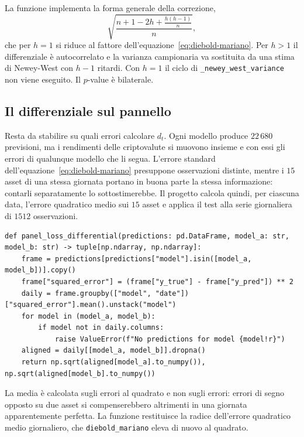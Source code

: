 La funzione implementa la forma generale della correzione,
$$\sqrt{\frac{n+1-2h+\frac{h(h-1)}{n}}{n}},$$
che per $h=1$ si riduce al fattore dell'equazione~\eqref{eq:diebold-mariano}. Per $h>1$ il differenziale è autocorrelato e la varianza campionaria va sostituita da una stima di Newey-West con $h-1$ ritardi. Con $h=1$ il ciclo di \texttt{\_newey\_west\_variance} non viene eseguito. Il $p$-value è bilaterale.

\subsection{Il differenziale sul pannello}

Resta da stabilire su quali errori calcolare $d_t$. Ogni modello produce $22\,680$ previsioni, ma i rendimenti delle criptovalute si muovono insieme e con essi gli errori di qualunque modello che li segua. L'errore standard dell'equazione~\eqref{eq:diebold-mariano} presuppone osservazioni distinte, mentre i $15$ asset di una stessa giornata portano in buona parte la stessa informazione: contarli separatamente lo sottostimerebbe. Il progetto calcola quindi, per ciascuna data, l'errore quadratico medio sui $15$ asset e applica il test alla serie giornaliera di $1512$ osservazioni.

\begin{listing}[H]
\begin{verbatim}
def panel_loss_differential(predictions: pd.DataFrame, model_a: str, model_b: str) -> tuple[np.ndarray, np.ndarray]:
    frame = predictions[predictions["model"].isin([model_a, model_b])].copy()
    frame["squared_error"] = (frame["y_true"] - frame["y_pred"]) ** 2
    daily = frame.groupby(["model", "date"])["squared_error"].mean().unstack("model")
    for model in (model_a, model_b):
        if model not in daily.columns:
            raise ValueError(f"No predictions for model {model!r}")
    aligned = daily[[model_a, model_b]].dropna()
    return np.sqrt(aligned[model_a].to_numpy()), np.sqrt(aligned[model_b].to_numpy())
\end{verbatim}
\caption{\texttt{panel\_loss\_differential}}
\label{lst:panel-loss-differential}
\end{listing}

La media è calcolata sugli errori al quadrato e non sugli errori: errori di segno opposto su due asset si compenserebbero altrimenti in una giornata apparentemente perfetta. La funzione restituisce la radice dell'errore quadratico medio giornaliero, che \texttt{diebold\_mariano} eleva di nuovo al quadrato.

